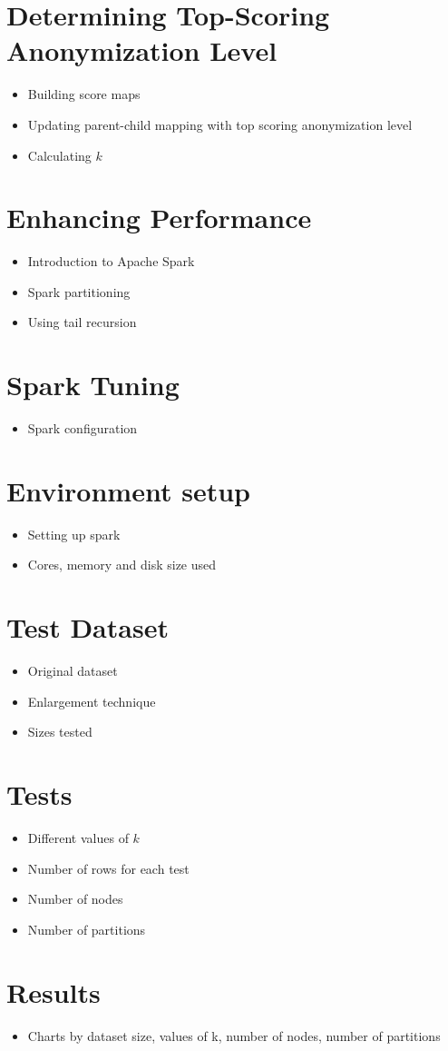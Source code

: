 \documentclass[11pt]{article}       %
\newenvironment{slide}[1]        {\section{#1} \begin{itemize}}%
                                 {\end{itemize}}
\begin{document}
\begin{slide}{Determining Top-Scoring Anonymization Level}
\item Building score maps
\item Updating parent-child mapping with top scoring anonymization level
\item Calculating $k$
\end{slide}

\begin{slide}{Enhancing Performance}
\item Introduction to Apache Spark
\item Spark partitioning
\item Using tail recursion
\end{slide}

\begin{slide}{Spark Tuning}
\item Spark configuration
\end{slide}

\begin{slide}{Environment setup}
\item Setting up spark
\item Cores, memory and disk size used
\end{slide}

\begin{slide}{Test Dataset}
\item Original dataset
\item Enlargement technique
\item Sizes tested
\end{slide}

\begin{slide}{Tests}
\item Different values of $k$
\item Number of rows for each test
\item Number of nodes
\item Number of partitions
\end{slide}

\begin{slide}{Results}
\item Charts by dataset size, values of k, number of nodes, number of partitions
\end{slide}
\end{document}
